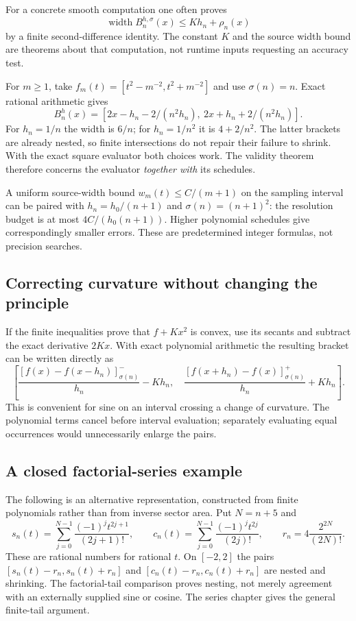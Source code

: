 For a concrete smooth computation one often proves
\[
 \operatorname{width}B_n^{h,\sigma}(x)
       \le K h_n+\rho_n(x)
\]
by a finite second-difference identity.  The constant $K$ and the source
width bound are theorems about that computation, not runtime inputs
requesting an accuracy test.

\begin{example}
For $m\ge1$, take $f_m(t)=[t^2-m^{-2},t^2+m^{-2}]$ and use
$\sigma(n)=n$.  Exact rational arithmetic gives
\[
 B_n^h(x)=
 [2x-h_n-2/(n^2h_n),\ 2x+h_n+2/(n^2h_n)].
\]
For $h_n=1/n$ the width is $6/n$; for $h_n=1/n^2$ it is $4+2/n^2$.
The latter brackets are already nested, so finite intersections do not
repair their failure to shrink.  With the exact square evaluator both
choices work.  The validity theorem therefore concerns the evaluator
\emph{together with} its schedules.
\end{example}

A uniform source-width bound $w_m(t)\le C/(m+1)$ on the sampling interval
can be paired with $h_n=h_0/(n+1)$ and
$\sigma(n)=(n+1)^2$: the resolution budget is at most
$4C/(h_0(n+1))$.  Higher polynomial schedules give correspondingly smaller
errors.  These are predetermined integer formulas, not precision searches.

\subsection{Correcting curvature without changing the principle}
If the finite inequalities prove that $f+Kx^2$ is convex, use its secants
and subtract the exact derivative $2Kx$.  With exact polynomial arithmetic
the resulting bracket can be written directly as
\[
 \left[
 \frac{[f(x)-f(x-h_n)]_{\sigma(n)}^-}{h_n}-Kh_n,
 \quad
 \frac{[f(x+h_n)-f(x)]_{\sigma(n)}^+}{h_n}+Kh_n
 \right].
\]
This is convenient for sine on an interval crossing a change of curvature.
The polynomial terms cancel before interval evaluation; separately evaluating
equal occurrences would unnecessarily enlarge the pairs.

\subsection{A closed factorial-series example}
\label{sec:fixed-factorial-sine}
The following is an alternative representation, constructed from finite
polynomials rather than from inverse sector area.  Put $N=n+5$ and
\[
 s_n(t)=\sum_{j=0}^{N-1}\frac{(-1)^jt^{2j+1}}{(2j+1)!},\qquad
 c_n(t)=\sum_{j=0}^{N-1}\frac{(-1)^jt^{2j}}{(2j)!},\qquad
 r_n=4\frac{2^{2N}}{(2N)!}.
\]
These are rational numbers for rational $t$.  On $[-2,2]$ the pairs
$[s_n(t)-r_n,s_n(t)+r_n]$ and $[c_n(t)-r_n,c_n(t)+r_n]$ are nested
and shrinking.  The factorial-tail comparison proves nesting, not merely
agreement with an externally supplied sine or cosine.  The series chapter
gives the general finite-tail argument.

